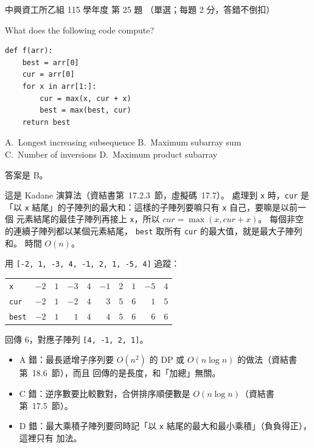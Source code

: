 \begin{pastexam}[label={px:nchu-115-is-25}]{中興資工所乙組 115 學年度 第 25 題}
（單選；每題 2 分，答錯不倒扣）

What does the following code compute?
\begin{verbatim}
def f(arr):
    best = arr[0]
    cur = arr[0]
    for x in arr[1:]:
        cur = max(x, cur + x)
        best = max(best, cur)
    return best
\end{verbatim}
A.~Longest increasing subsequence \qquad B.~Maximum subarray sum\\
C.~Number of inversions \qquad D.~Maximum product subarray
\end{pastexam}

\begin{pastsoln}
答案是 B。

這是 Kadane 演算法（資結書第~17.2.3~節，虛擬碼~17.7）。 處理到 \texttt{x} 時，\texttt{cur} 是
「以 \texttt{x} 結尾」的子陣列的最大和：這樣的子陣列要嘛只有 \texttt{x} 自己，要嘛是以前一個
元素結尾的最佳子陣列再接上 \texttt{x}，所以
$\mathit{cur} = \max(x, \mathit{cur} + x)$。 每個非空的連續子陣列都以某個元素結尾，
\texttt{best} 取所有 \texttt{cur} 的最大值，就是最大子陣列和。 時間 $O(n)$。

用 \texttt{[-2, 1, -3, 4, -1, 2, 1, -5, 4]} 追蹤：
\begin{center}
\small
\begin{tabular}{l*{9}{r}}
\toprule
\texttt{x} & $-2$ & $1$ & $-3$ & $4$ & $-1$ & $2$ & $1$ & $-5$ & $4$ \\
\texttt{cur} & $-2$ & $1$ & $-2$ & $4$ & $3$ & $5$ & $6$ & $1$ & $5$ \\
\texttt{best} & $-2$ & $1$ & $1$ & $4$ & $4$ & $5$ & $6$ & $6$ & $6$ \\
\bottomrule
\end{tabular}
\end{center}
回傳 $6$，對應子陣列 \texttt{[4, -1, 2, 1]}。
\begin{itemize}
\item A 錯：最長遞增子序列要 $O(n^2)$ 的 DP 或 $O(n \log n)$ 的做法（資結書第~18.6~節），而且
回傳的是長度，和「加總」無關。
\item C 錯：逆序數要比較數對，合併排序順便數是 $O(n \log n)$（資結書第~17.5~節）。
\item D 錯：最大乘積子陣列要同時記「以 \texttt{x} 結尾的最大和最小乘積」（負負得正），這裡只有
加法。
\end{itemize}
\end{pastsoln}
